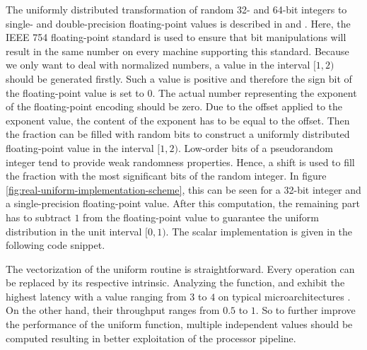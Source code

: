 \documentclass{stdlocal}
\begin{document}
    The uniformly distributed transformation of random 32- and 64-bit integers to single- and double-precision floating-point values is described in \textcite{vigna-xoroshiro} and \textcite{kneusel2018}.
    Here, the IEEE 754 floating-point standard is used to ensure that bit manipulations will result in the same number on every machine supporting this standard.
    Because we only want to deal with normalized numbers, a value in the interval $[1,2)$ should be generated firstly.
    Such a value is positive and therefore the sign bit of the floating-point value is set to $0$.
    The actual number representing the exponent of the floating-point encoding should be zero.
    Due to the offset applied to the exponent value, the content of the exponent has to be equal to the offset.
    Then the fraction can be filled with random bits to construct a uniformly distributed floating-point value in the interval $[1,2)$.
    Low-order bits of a pseudorandom integer tend to provide weak randomness properties.
    Hence, a shift is used to fill the fraction with the most significant bits of the random integer.
    In figure \ref{fig:real-uniform-implementation-scheme}, this can be seen for a 32-bit integer and a single-precision floating-point value.
    After this computation, the remaining part has to subtract $1$ from the floating-point value to guarantee the uniform distribution in the unit interval $[0,1)$.
    The scalar implementation is given in the following code snippet.

    The vectorization of the uniform routine is straightforward.
    Every operation can be replaced by its respective intrinsic.
    Analyzing the function,  and  exhibit the highest latency with a value ranging from $3$ to $4$ on typical microarchitectures \autocite{intel-intrinsics-guide,fog2019d}.
    On the other hand, their throughput ranges from $0.5$ to $1$.
    So to further improve the performance of the uniform function, multiple independent values should be computed resulting in better exploitation of the processor pipeline.




\end{document}
